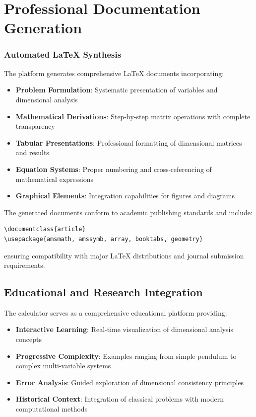 \section{Professional Documentation Generation}
\subsubsection*{Automated LaTeX Synthesis}
The platform generates comprehensive LaTeX documents incorporating:
\begin{itemize}
    \item \textbf{Problem Formulation}: Systematic presentation of variables and dimensional analysis
    \item \textbf{Mathematical Derivations}: Step-by-step matrix operations with complete transparency
    \item \textbf{Tabular Presentations}: Professional formatting of dimensional matrices and results
    \item \textbf{Equation Systems}: Proper numbering and cross-referencing of mathematical expressions
    \item \textbf{Graphical Elements}: Integration capabilities for figures and diagrams
\end{itemize}

The generated documents conform to academic publishing standards and include:
\begin{verbatim}
\documentclass{article}
\usepackage{amsmath, amssymb, array, booktabs, geometry}
\end{verbatim}
ensuring compatibility with major LaTeX distributions and journal submission requirements.

\subsection{Educational and Research Integration}
The calculator serves as a comprehensive educational platform providing:
\begin{itemize}
    \item \textbf{Interactive Learning}: Real-time visualization of dimensional analysis concepts
    \item \textbf{Progressive Complexity}: Examples ranging from simple pendulum to complex multi-variable systems
    \item \textbf{Error Analysis}: Guided exploration of dimensional consistency principles
    \item \textbf{Historical Context}: Integration of classical problems with modern computational methods
\end{itemize}

